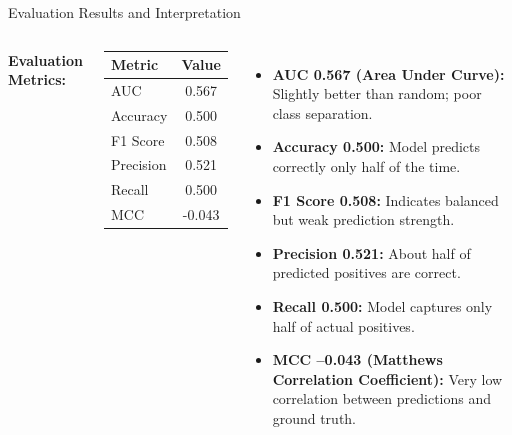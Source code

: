 \documentclass[aspectratio=169, table]{beamer}
\begin{document}
\begin{frame}{Evaluation Results and Interpretation}
	\vspace{5pt}
	\begin{columns}
		
		\textbf{Evaluation Metrics:}
		\begin{center}
			\begin{tabular}{|l|c|}
				\hline
				\textbf{Metric} & \textbf{Value} \\
				\hline
				AUC & 0.567 \\
				Accuracy & 0.500 \\
				F1 Score & 0.508 \\
				Precision & 0.521 \\
				Recall & 0.500 \\
				MCC & -0.043 \\
				\hline
			\end{tabular}
		\end{center}
		
		\begin{itemize}
			\item \textbf{AUC 0.567 (Area Under Curve):} Slightly better than random; poor class separation.
			\item \textbf{Accuracy 0.500:} Model predicts correctly only half of the time.
			\item \textbf{F1 Score 0.508:} Indicates balanced but weak prediction strength.
			\item \textbf{Precision 0.521:} About half of predicted positives are correct.
			\item \textbf{Recall 0.500:} Model captures only half of actual positives.
			\item \textbf{MCC –0.043 (Matthews Correlation Coefficient):} Very low correlation between predictions and ground truth.
		\end{itemize}
	\end{columns}
\end{frame}
\end{document}

